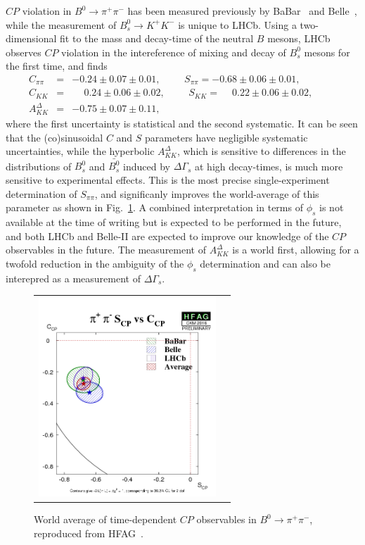 $CP$ violation in $B^0 \to \pi^+ \pi^-$ has been measured previously by BaBar~\cite{Lees:2012mma} and Belle~\cite{Adachi:2013mae},
while the measurement of $B^0_s \to K^+ K^-$ is unique to LHCb. Using a two-dimensional fit to the mass and decay-time
of the neutral $B$ mesons, LHCb observes $CP$ violation in the intereference of mixing and decay of $B^0_s$ mesons for the first time, 
and finds
\begin{eqnarray}
C_{\pi\pi}      &=& -0.24 \pm 0.07 \pm 0.01,\phantom{space}
S_{\pi\pi}      = -0.68 \pm 0.06 \pm 0.01,\phantom{space}
\\
C_{KK}      &=& \phantom{+}0.24 \pm 0.06 \pm 0.02,\phantom{space}
S_{KK}      = \phantom{+}0.22 \pm 0.06 \pm 0.02,\phantom{space}
\\
A^{\Delta}_{KK}      &=& -0.75 \pm 0.07 \pm 0.11,\phantom{space}
\end{eqnarray}
where the first uncertainty is statistical and the second systematic. It can be seen that the (co)sinusoidal $C$ and $S$ parameters have
negligible systematic uncertainties, while the hyperbolic $A^{\Delta}_{KK}$, which is sensitive to differences in the distributions
of $B^0_s$ and $\bar{B^0_s}$ induced by $\Delta\Gamma_s$ at high decay-times, is much more sensitive to experimental effects.
This is the most precise single-experiment
determination of $S_{\pi\pi}$, and significanly improves the world-average of this parameter as shown in Fig.~\ref{b2pipiwahfag}.
A combined interpretation in terms of $\phi_s$ is not available at the time of writing but is expected to be performed
in the future, and both LHCb and Belle-II are expected to improve our knowledge of the $CP$ observables in the future. 
The measurement of $A^{\Delta}_{KK}$ is a world first, allowing for a twofold reduction in the ambiguity of the $\phi_s$ determination
and can also be interepred as a measurement of $\Delta\Gamma_s$.

\begin{figure}
  \begin{center}
    \begin{tabular}{c c}
      \includegraphics[height=7.5cm]{figs/pi+pi-S_CPvsC_CP.png} &
    \end{tabular}
  \end{center}
  \vspace{-0.5cm}
  \caption{\label{b2pipiwahfag}World average of time-dependent $CP$ observables in $B^0 \to \pi^+ \pi^-$, reproduced from HFAG~\cite{HFAG}.}
\end{figure}
